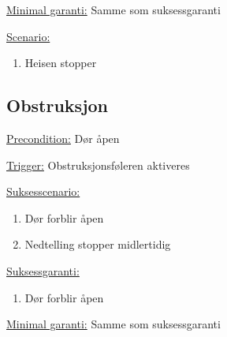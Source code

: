 \documentclass[a4paper]{article}
\begin{document}
\underline{Minimal garanti:} 
Samme som suksessgaranti

\underline{Scenario:} 
\begin{enumerate}
\item Heisen stopper
\end{enumerate}

\subsection*{Obstruksjon}
\underline{Precondition:}
Dør åpen

\underline{Trigger:}
Obstruksjonsføleren aktiveres

\underline{Suksesscenario:}
\begin{enumerate}
\item Dør forblir åpen
\item Nedtelling stopper midlertidig
\end{enumerate}

\underline{Suksessgaranti:}
\begin{enumerate}
\item Dør forblir åpen
\end{enumerate}
\underline{Minimal garanti:}
Samme som suksessgaranti
\end{document}
